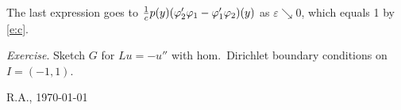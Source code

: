 \documentclass[12pt,a4paper]{article}
\begin{document}
    
    The last expression goes to 
    $
        \frac1c 
        p({y})
        (\varphi_2' \varphi_1 - \varphi_1' \varphi_2)({y}) 
    $
    as
    $\varepsilon \searrow 0$,
    which equals 1 by \eqref{e:c}.
  
     
    
    \emph{Exercise}. 
    Sketch $G$ for $L u = -u''$ with hom.~Dirichlet boundary conditions
    on $I = (-1, 1)$.
    
    \vfill\hfill 
    R.A., \today
\end{document}
